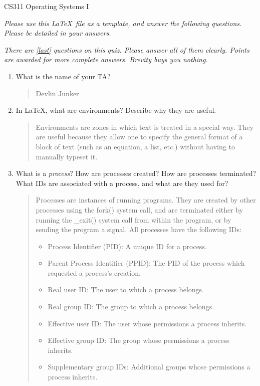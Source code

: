 \documentclass[letterpaper,10pt,onecolumn,titlepage]{article}
\begin{document}


{\Large CS311 Operating Systems I}

\emph{Please use this \LaTeX\ file as a template, and answer the following questions.
  Please be detailed in your answers.}

\emph{There are \ref{last} questions on this quiz. Please answer all of them clearly.
  Points are awarded for more complete answers. Brevity buys you nothing.}


\begin{enumerate}[itemsep=0.1 in]
\item What is the name of your TA?

\begin{quote}
Devlin Junker
\end{quote}

\item In \LaTeX, what are environments? Describe why they are useful.

\begin{quote}
Environments are zones in which text is treated in a special way.  They are useful because they allow one to specify the general format of a block of text (such as an equation, a list, etc.) without having to manually typeset it.
\end{quote}

\item What is a \emph{process}? How are processes created? How are processes terminated?
  What IDs are associated with a process, and what are they used for?

\begin{quote}
  Processes are instances of running programs. They are created by other processes using the fork() system call, and are terminated either by running the \_exit() system call from within the program, or by sending the program a signal. All processes have the following IDs:

  \begin{itemize}
    \item Process Identifier (PID): A unique ID for a process.
    \item Parent Process Identifier (PPID): The PID of the process which requested a process's creation.
    \item Real user ID: The user to which a process belongs.
    \item Real group ID: The group to which a process belongs.
    \item Effective user ID: The user whose permissions a process inherits.
    \item Effective group ID: The group whose permissions a process inherits.
    \item Supplementary group IDs: Additional groups whose permissions a process inherits.
  \end{itemize}


\end{quote}
\end{enumerate}
\end{document}
